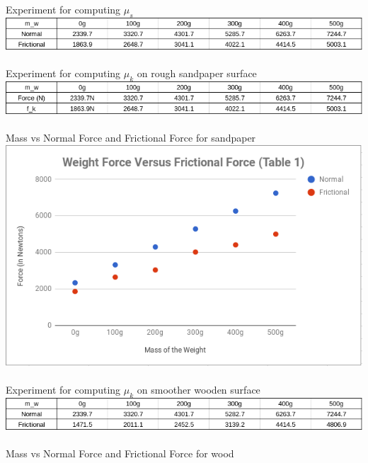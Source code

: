 \documentclass[12pt]{article}
\begin{document}
        {\large Experiment for computing $\mu_s$ } \\
        \includegraphics[scale=0.75]{GraphStatic1.png} \\ \\ 
        {\large Experiment for computing $\mu_k$ on rough sandpaper surface } \\
        \includegraphics[scale=0.75 ]{GraphKinetic1.png} \\ \\
        {\large Mass vs Normal Force and Frictional Force for sandpaper} \\ 
        \includegraphics[scale=0.75]{GraphWeightVsFriction1.png} \\ \\
        {\large Experiment for computing $\mu_k$ on smoother wooden surface} \\
        \includegraphics[width=\textwidth]{GraphKinetic2.png} \\ \\
        {\large Mass vs Normal Force and Frictional Force for wood} \\ 
\end{document}
